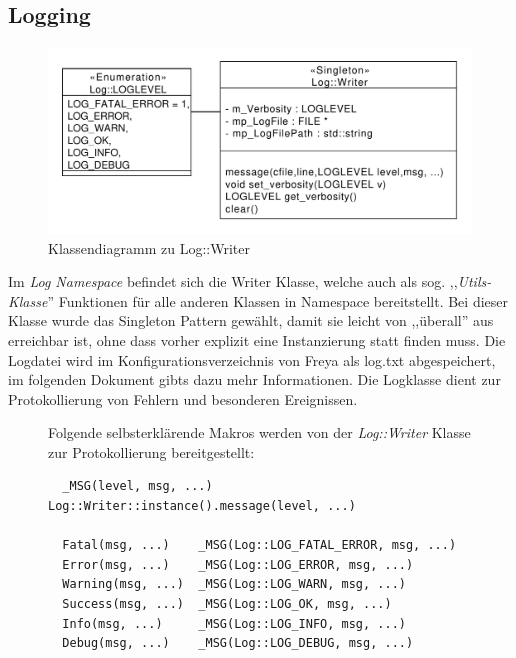 \subsection{Logging}
\begin{figure}[htb!]
    \centering
    \includegraphics[scale=0.6]{./gfx/class/log}
    \caption{Klassendiagramm zu Log::Writer}
    \label{c_log}
\end{figure}
Im \emph{Log Namespace} befindet sich die Writer Klasse, welche auch als sog. ,,\textit{Utils-Klasse}'' Funktionen für alle anderen
Klassen in Namespace bereitstellt. Bei dieser Klasse wurde das Singleton Pattern gewählt, damit sie leicht von ,,überall'' aus erreichbar ist, ohne dass vorher explizit eine Instanzierung statt finden muss. Die Logdatei wird im Konfigurationsverzeichnis von Freya als log.txt
abgespeichert, im folgenden Dokument gibts dazu mehr Informationen. 
Die Logklasse dient zur Protokollierung von Fehlern und besonderen Ereignissen.  

\begin{figure}[htb!]
    Folgende selbsterklärende Makros werden von der \emph{Log::Writer} Klasse zur Protokollierung bereitgestellt:

  \begin{verbatim}
  _MSG(level, msg, ...) Log::Writer::instance().message(level, ...)

  Fatal(msg, ...)    _MSG(Log::LOG_FATAL_ERROR, msg, ...)
  Error(msg, ...)    _MSG(Log::LOG_ERROR, msg, ...)
  Warning(msg, ...)  _MSG(Log::LOG_WARN, msg, ...)
  Success(msg, ...)  _MSG(Log::LOG_OK, msg, ...)
  Info(msg, ...)     _MSG(Log::LOG_INFO, msg, ...)
  Debug(msg, ...)    _MSG(Log::LOG_DEBUG, msg, ...)
  \end{verbatim}
\end{figure}

